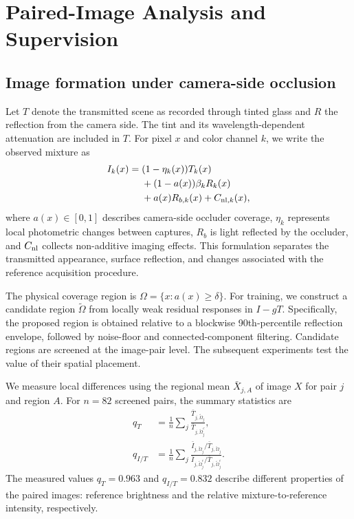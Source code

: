 \section{Paired-Image Analysis and Supervision}
\label{sec:method}

\subsection{Image formation under camera-side occlusion}

Let $T$ denote the transmitted scene as recorded through tinted
glass and $R$ the reflection from the camera side. The tint and
its wavelength-dependent attenuation are included in $T$.
For pixel $x$ and color channel $k$, we write the observed
mixture as
\begin{equation}
\begin{aligned}
I_k(x)={}&(1-\eta_k(x))T_k(x)\\
&+(1-a(x))\beta_kR_k(x)\\
&+a(x)R_{b,k}(x)+C_{{\rm nl},k}(x),
\end{aligned}
\label{eq:omega}
\end{equation}
where $a(x)\in[0,1]$ describes camera-side occluder coverage,
$\eta_k$ represents local photometric changes between captures,
$R_b$ is light reflected by the occluder, and $C_{\rm nl}$
collects non-additive imaging effects. This formulation separates
the transmitted appearance, surface reflection, and changes
associated with the reference acquisition procedure.

The physical coverage region is
$\Omega=\{x:a(x)\geq\delta\}$. For training, we construct a
candidate region $\tilde\Omega$ from locally weak residual
responses in $I-gT$. Specifically, the proposed region is
obtained relative to a blockwise 90th-percentile reflection
envelope, followed by noise-floor and connected-component
filtering. Candidate regions are screened at the image-pair
level. The subsequent experiments test the value of their
spatial placement.

We measure local differences using the regional mean
$\bar X_{j,A}$ of image $X$ for pair $j$ and region $A$.
For $n=82$ screened pairs, the summary statistics are
\begin{equation}
\begin{aligned}
q_T &=
\frac1n\sum_j
\frac{\bar T_{j,\tilde\Omega_j}}
     {\bar T_{j,\tilde\Omega_j^c}},\\
q_{I/T} &=
\frac1n\sum_j
\frac{\bar I_{j,\tilde\Omega_j}/\bar T_{j,\tilde\Omega_j}}
     {\bar I_{j,\tilde\Omega_j^c}/\bar T_{j,\tilde\Omega_j^c}}.
\end{aligned}
\label{eq:regional-ratios}
\end{equation}
The measured values $q_T=0.963$ and $q_{I/T}=0.832$
describe different properties of the paired images:
reference brightness and the relative mixture-to-reference
intensity, respectively.

